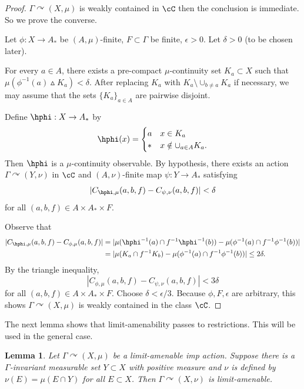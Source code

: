 \documentclass[12pt]{article}
\theoremstyle{plain}
\newtheorem{lem}[thm]{Lemma}
\theoremstyle{definition}
\theoremstyle{remark}
\newcommand{\G}{\Gamma}
\newcommand{\eps}{\epsilon}
\def\cc{{\curvearrowright}}
\begin{document}
\begin{proof}
$\G \cc (X,\mu)$ is weakly contained in $\cC$ then the conclusion is immediate. So we prove the converse. 

Let $\phi:X \to A_*$ be $(A,\mu)$-finite, $F \subset \G$ be finite, $\eps>0$. Let $\delta>0$ (to be chosen later). 

For every $a\in A$, there exists a pre-compact $\mu$-continuity set $K_a\subset X$ such that $\mu(\phi^{-1}(a)\vartriangle K_a)<\delta$. After replacing $K_a$ with $K_a \setminus \cup_{b \ne a} K_a$ if necessary, we may assume that the sets $\{K_a\}_{a\in A}$ are pairwise disjoint. 

Define $\hphi:X \to A_*$ by 
\begin{displaymath}
    \hphi(x) = 
    \begin{cases}
        a & x\in K_a \\
        * &  x \notin \cup_{a\in A} K_a.
    \end{cases}
\end{displaymath}
Then $\hphi$ is a $\mu$-continuity observable. By hypothesis, there exists an action $\G \cc (Y,\nu)$ in $\cC$ and $(A,\nu)$-finite map $\psi:Y \to A_*$ satisfying
 $$|C_{\hphi,\mu}(a,b,f) - C_{\psi,\nu}(a,b,f)|<\delta$$
for all $(a,b,f) \in A \times A_*\times F$.  

Observe that
\begin{align*}
    |C_{\hphi,\mu}(a,b,f) - C_{\phi,\mu}(a,b,f)| &= |\mu(\hphi^{-1}(a) \cap f^{-1}\hphi^{-1}(b)) - \mu(\phi^{-1}(a) \cap f^{-1}\phi^{-1}(b))| \\
    &= |\mu(K_a \cap f^{-1}K_b) - \mu(\phi^{-1}(a) \cap f^{-1}\phi^{-1}(b))| \le 2\delta.
\end{align*}
By the triangle inequality,
$$|C_{\phi,\mu}(a,b,f) - C_{\psi,\nu}(a,b,f)|<3\delta$$
for all $(a,b,f) \in A \times A_*\times F$. Choose $\delta < \eps/3$. Because $\phi, F, \eps$ are arbitrary, this shows $\G \cc (X,\mu)$ is weakly contained in the class $\cC$.
\end{proof}


The next lemma shows that limit-amenability passes to restrictions. This will be used in the general case. 

\begin{lem}\label{L:abs-continuity}
    Let $\G \cc (X,\mu)$ be a limit-amenable imp action. Suppose there is a $\G$-invariant measurable set $Y \subset X$ with positive measure and $\nu$ is defined by $\nu(E)=\mu(E\cap Y)$ for all $E \subset X$. Then $\G \cc (X,\nu)$ is limit-amenable.
\end{lem}
\end{document}
